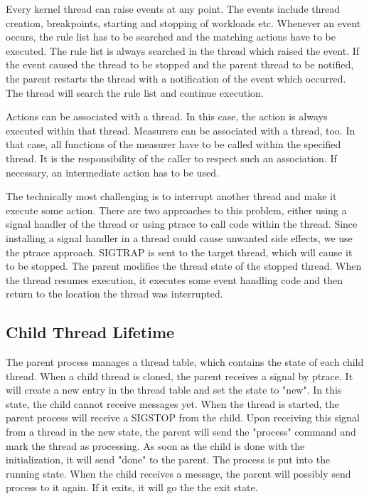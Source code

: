 \documentclass[a4paper,12pt]{article}
\begin{document}
Every kernel thread can raise events at any point. The events include thread creation, breakpoints, starting and stopping of workloads etc. Whenever an event occurs, the rule list has to be searched and the matching actions have to be executed. The rule list is always searched in the thread which raised the event. If the event caused the thread to be stopped and the parent thread to be notified, the parent restarts the thread with a notification of the event which occurred. The thread will search the rule list and continue execution.

Actions can be associated with a thread. In this case, the action is always executed within that thread. Measurers can be associated with a thread, too. In that case, all functions of the measurer have to be called within the specified thread. It is the responsibility of the caller to respect such an association. If necessary, an intermediate action has to be used.

The technically most challenging is to interrupt another thread and make it execute some action. There are two approaches to this problem, either using a signal handler of the thread or using ptrace to call code within the thread. Since installing a signal handler in a thread could cause unwanted side effects, we use the ptrace approach. SIGTRAP is sent to the target thread, which will cause it to be stopped. The parent modifies the thread state of the stopped thread. When the thread resumes execution, it executes some event handling code and then return to the location the thread was interrupted.

\subsection{Child Thread Lifetime}
The parent process manages a thread table, which contains the state of each child thread. When a child thread is cloned, the parent receives a signal by ptrace. It will create a new entry in the thread table and set the state to "new". In this state, the child cannot receive messages yet. When the thread is started, the parent process will receive a SIGSTOP from the child. Upon receiving this signal from a thread in the new state, the parent will send the "process" command and mark the thread as processing. As soon as the child is done with the initialization, it will send "done" to the parent. The process is put into the running state. When the child receives a message, the parent will possibly send process to it again. If it exits, it will go the the exit state.
\end{document}
